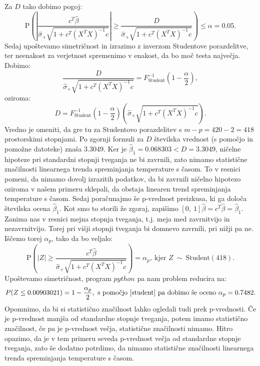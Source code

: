 \documentclass{article}
\begin{document}
Za $D$ tako dobimo pogoj:
$$
\text{P}\left(\left|\frac{c^T\hat{\beta}}{\hat{\sigma}_{+}\sqrt{1 + c^T(X^TX)^{-1}c}}\right| \geq \frac{D}{\hat{\sigma}_{+}\sqrt{1 + c^T(X^TX)^{-1}c}}\right)\leq \alpha = 0.05. 
$$
Sedaj upoštevamo simetričnost in izrazimo z inverzom Studentove porazdelitve, ter neenakost za verjetnost spremenimo v enakost, da bo moč testa največja. Dobimo:
$$
\frac{D}{\hat{\sigma}_{+}\sqrt{1 + c^T(X^TX)^{-1}c}} = F^{-1}_{\text{Student}}\left(1 - \frac{\alpha}{2}\right),
$$
oziroma:
$$
D = F^{-1}_{\text{Student}}\left(1 - \frac{\alpha}{2}\right) \left(\hat{\sigma}_{+}\sqrt{1 + c^T(X^TX)^{-1}c}\right).
$$
Vredno je omeniti, da gre tu za Studentovo porazdelitev s $m - p = 420 - 2 = 418$ prostorskimi stopnjami. 
Po zgornji formuli za $D$ številska vrednost (s pomočjo \cite{student} in pomožne datoteke) znaša $3.3049$.
\newline
Ker je $\hat{\beta}_1 = 0.068303 < D = 3.3049$, ničelne hipoteze pri standardni stopnji tveganja ne bi zavrnili, zato nimamo statistične značilnosti linearnega trenda spreminjanja temperature s časom. 
To v resnici pomeni, da nimamo dovolj izrazitih podatkov, da bi zavrnili ničelno hipotezo oziroma v našem primeru sklepali, da obstaja linearen trend spreminjanja temperature s časom.
\newline
\newline
Sedaj poračunajmo še p-vrednost preizkusa, ki ga določa številska ocena $\hat{\beta}_1$. 
Kot smo to storili že zgoraj, zapišimo $[0,~1]\hat{\beta} = c^T \hat{\beta} = \hat{\beta}_1$.
Zanima nas v resnici mejna stopnja tveganja, t.j. meja med zavrnitvijo in nezavrnitvijo. 
Torej pri višji stopnji tveganja bi domnevo zavrnili, pri nižji pa ne. 
Iščemo torej $\alpha_p$, tako da bo veljalo:
$$
\text{P}\left(|Z| \geq \frac{c^T\hat{\beta}}{\hat{\sigma}_{+}\sqrt{1 + c^T(X^TX)^{-1}c}}\right) = \alpha_p,~\text{kjer }Z~\sim~\text{Student}(418). 
$$
Upoštevamo simetričnost, program $python$ pa nam problem reducira na: 
$$
P(Z \leq 0.00903021) = 1 - \frac{\alpha_p}{2},~\text{s pomočjo \cite{student} pa dobimo še oceno $\alpha_p = 0.7482$.}
$$
Opomnimo, da bi si statistično značilnost lahko ogledali tudi prek p-vrednosti. Če je p-vrednost manjša od standardne stopnje tveganja, potem imamo statistično značilnost, če pa je p-vrednost večja, statistične značilnosti nimamo. 
Hitro opazimo, da je v tem primeru seveda p-vrednost večja od standardne stopnje tveganja, zato še dodatno potrdimo, da nimamo statistične značilnosti linearnega trenda spreminjanja temperature s časom.
\newline
\newline
\end{document}
